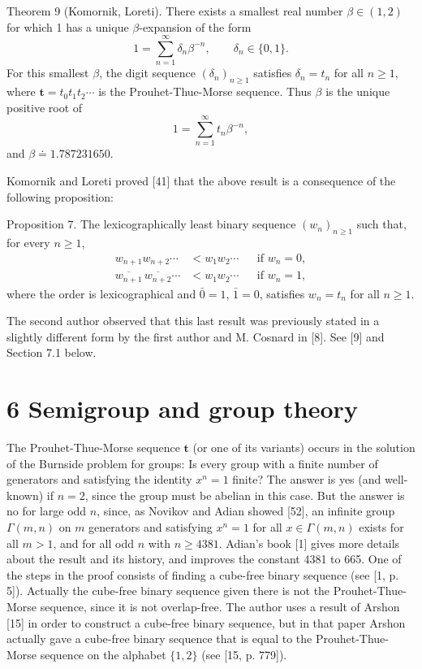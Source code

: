\documentclass[10pt]{article}
\begin{document}
Theorem 9 (Komornik, Loreti). There exists a smallest real number $\beta\in(1,2)$ for which 1 has a unique $\beta$-expansion of the form
\[
1=\sum_{n=1}^{\infty}\delta_n\beta^{-n},\qquad \delta_n\in\{0,1\}.
\]
For this smallest $\beta$, the digit sequence $(\delta_n)_{n\geq 1}$ satisfies $\delta_n=t_n$ for all $n\geq 1$, where $\mathbf{t}=t_0t_1t_2\cdots$ is the Prouhet-Thue-Morse sequence. Thus $\beta$ is the unique positive root of
\[
1=\sum_{n=1}^{\infty}t_n\beta^{-n},
\]
and $\beta\doteq 1.787231650$.

Komornik and Loreti proved [41] that the above result is a consequence of the following proposition:

Proposition 7. The lexicographically least binary sequence $(w_n)_{n\geq 1}$ such that, for every $n\geq 1$,
\[
\begin{aligned}
w_{n+1}w_{n+2}\cdots &< w_1w_2\cdots &&\text{if }w_n=0,\\
\overline{w_{n+1}}\,\overline{w_{n+2}}\cdots &< w_1w_2\cdots &&\text{if }w_n=1,
\end{aligned}
\]
where the order is lexicographical and $\bar 0=1$, $\bar 1=0$, satisfies $w_n=t_n$ for all $n\geq 1$.

The second author observed that this last result was previously stated in a slightly different form by the first author and M. Cosnard in [8]. See [9] and Section 7.1 below.

\section*{6 Semigroup and group theory}
The Prouhet-Thue-Morse sequence $\mathbf{t}$ (or one of its variants) occurs in the solution of the Burnside problem for groups: Is every group with a finite number of generators and satisfying the identity $x^{n}=1$ finite? The answer is yes (and well-known) if $n=2$, since the group must be abelian in this case. But the answer is no for large odd $n$, since, as Novikov and Adian showed [52], an infinite group $\Gamma(m, n)$ on $m$ generators and satisfying $x^{n}=1$ for all $x \in \Gamma(m, n)$ exists for all $m>1$, and for all odd $n$ with $n \geq 4381$. Adian's book [1] gives more details about the result and its history, and improves the constant 4381 to 665. One of the steps in the proof consists of finding a cube-free binary sequence (see [1, p. 5]). Actually the cube-free binary sequence given there is not the Prouhet-Thue-Morse sequence, since it is not overlap-free. The author uses a result of Arshon [15] in order to construct a cube-free binary sequence, but in that paper Arshon actually gave a cube-free binary sequence that is equal to the Prouhet-Thue-Morse sequence on the alphabet $\{1,2\}$ (see [15, p. 779]).
\end{document}
